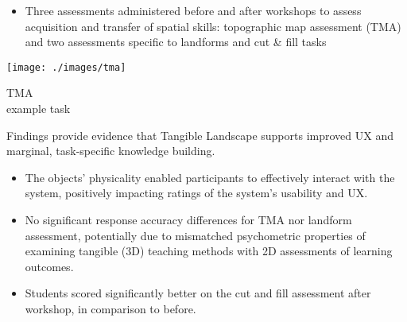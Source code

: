 \documentclass[innermargin=10mm]{tikzposter} %
\newcommand{\blocktitlesize}{\huge }
\begin{document}
\begin{columns}
{\begin{description}[leftmargin=0cm]
\begin{itemize}[leftmargin=1.5cm]
 \item[\textbullet{} ] Three assessments administered before and after workshops to assess acquisition
 and transfer of spatial skills: topographic map assessment (TMA) and  two assessments specific to landforms and cut \& fill tasks
\end{itemize}
\vspace{0.2em}
\begin{minipage}{0.85\linewidth}
\texttt{[image: ./images/tma]}
\end{minipage}
%
\begin{minipage}{0.14\linewidth}
\fontsize{27}{30.} \selectfont TMA\\ example task
\end{minipage}

\vspace{0.5em}
\item[Results ]
Findings provide evidence that Tangible Landscape supports 
improved UX and marginal, task-specific knowledge building.
\begin{itemize}[leftmargin=1.5cm]
 \item[\textbullet{} ] The objects' physicality enabled
participants to effectively interact with the system,
positively impacting ratings of the system's usability and UX.
\item[\textbullet{} ] No significant response accuracy differences for TMA nor landform assessment,
potentially due to mismatched psychometric properties of examining tangible (3D)
teaching methods with 2D assessments of learning outcomes.
 \item[\textbullet{} ] Students scored significantly better on the cut and fill assessment after workshop, in comparison to before.
\end{itemize}


\end{description}


\setlength{\parskip}{0.5cm}
\LARGE

}

\block[titleleft,titleinnersep=8mm]{\blocktitlesize Additional resources}{

}
\end{columns}
\end{document}
